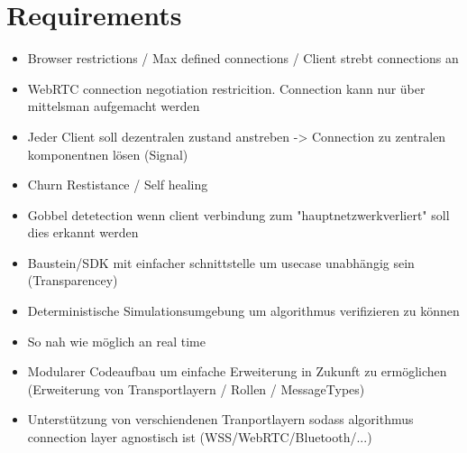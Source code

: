 \section{Requirements}

\begin{itemize}
    \item Browser restrictions / Max defined connections / Client strebt connections an
    \item WebRTC connection negotiation restricition. Connection kann nur über mittelsman aufgemacht werden
    \item Jeder Client soll dezentralen zustand anstreben -> Connection zu zentralen komponentnen lösen (Signal)
    \item Churn Restistance / Self healing
    \item Gobbel detetection wenn client verbindung zum "hauptnetzwerkverliert" soll dies erkannt werden
    \item Baustein/SDK mit einfacher schnittstelle um usecase unabhängig sein (Transparencey)
    \item Deterministische Simulationsumgebung um algorithmus verifizieren zu können
    \item So nah wie möglich an real time
    \item Modularer Codeaufbau um einfache Erweiterung in Zukunft zu ermöglichen (Erweiterung von Transportlayern / Rollen / MessageTypes)
    \item Unterstützung von verschiendenen Tranportlayern sodass algorithmus connection layer agnostisch ist (WSS/WebRTC/Bluetooth/...)
\end{itemize}
